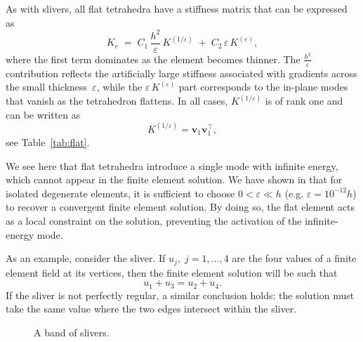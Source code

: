 \documentclass{article}
\begin{document}
As with slivers, all flat tetrahedra have a stiffness matrix that can be expressed as
\[
K_e \;=\; 
C_1\,\frac{h^2}{\varepsilon}\,K^{(1/\varepsilon)} 
\;+\;
C_2\,\varepsilon\,K^{(\varepsilon)},
\]
where the first term dominates as the element becomes thinner. 
The \( \tfrac{h^2}{\varepsilon} \) contribution reflects the artificially large stiffness 
associated with gradients across the small thickness~\(\varepsilon\), 
while the \( \varepsilon\,K^{(\varepsilon)} \) part corresponds to 
the in-plane modes that vanish as the tetrahedron flattens. In all cases, \(K^{(1/\varepsilon)}\) is of rank one and can be written as
\[
K^{(1/\varepsilon)} = \boldsymbol{v}_1 \boldsymbol{v}_1^{\!\top},
\]
see Table~\ref{tab:flat}. 


We see here that flat tetrahedra introduce a single mode with infinite energy,
which cannot appear in the finite element solution. We have shown in \cite{quiriny2024tempered} that for isolated degenerate elements, it is sufficient to choose $0 < \varepsilon \ll h$ (e.g. $\varepsilon = 10^{-12} h$) to recover a convergent finite element solution.
By doing so, the flat element acts as a local constraint on the solution, preventing the activation of the infinite-energy mode.

As an example, consider the sliver. If \(u_j,\; j = 1, \dots, 4\) are the four values of a finite element field
at its vertices, then the finite element solution will be such that 
\begin{equation}
\label{eq:locksliver}
u_1 + u_3 = u_2 + u_4.    
\end{equation}
If the sliver is not perfectly regular, a similar conclusion holds:
the solution must take the same value where the two edges intersect within the sliver.

\begin{figure}
    \centering
{}
    \caption{A band of slivers.}
    \label{fig:sliverband}
\end{figure}
\end{document}
